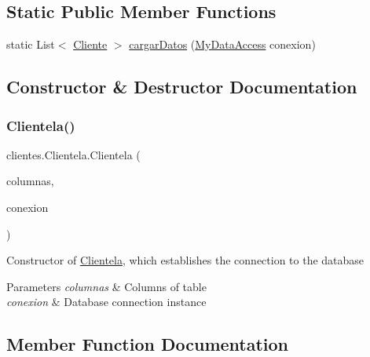 \subsection*{Static Public Member Functions}
\begin{DoxyCompactItemize}
\item 
static List$<$ \mbox{\hyperlink{classclientes_1_1_cliente}{Cliente}} $>$ \mbox{\hyperlink{classclientes_1_1_clientela_a2892095286ae0f52220099674a8b90d8}{cargar\+Datos}} (\mbox{\hyperlink{classconexion_s_q_l_1_1_my_data_access}{My\+Data\+Access}} conexion)
\end{DoxyCompactItemize}


\subsection{Constructor \& Destructor Documentation}
\mbox{\label{classclientes_1_1_clientela_af168d8a11882d39c22e0e18bd9689deb}} 
\subsubsection{\texorpdfstring{Clientela()}{Clientela()}}
{\footnotesize\ttfamily clientes.\+Clientela.\+Clientela (\begin{DoxyParamCaption}\item[{\mbox{\hyperlink{classclientes_1_1_modelo_columnas_tabla}{Modelo\+Columnas\+Tabla}}}]{columnas,  }\item[{\mbox{\hyperlink{classconexion_s_q_l_1_1_my_data_access}{My\+Data\+Access}}}]{conexion }\end{DoxyParamCaption})\hspace{0.3cm}{\ttfamily [inline]}}

Constructor of \mbox{\hyperlink{classclientes_1_1_clientela}{Clientela}}, which establishes the connection to the database 
\begin{DoxyParams}{Parameters}
{\em columnas} & Columns of table \\
\hline
{\em conexion} & Database connection instance \\
\hline
\end{DoxyParams}


\subsection{Member Function Documentation}
\mbox{\label{classclientes_1_1_clientela_acea670c44be086472e0ccd9c3f2c1f67}} 
